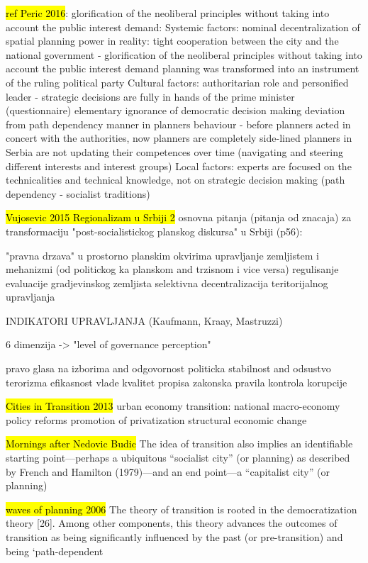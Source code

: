 \documentclass[11pt]{report}
\begin{document}
\hl{ref Peric 2016}:
glorification of the neoliberal principles without taking into account the public interest demand:
    Systemic factors:
nominal decentralization of spatial planning power
in reality: tight cooperation between the city and the national government - 
glorification of the neoliberal principles without taking into account the public interest demand
planning was transformed into an instrument of the ruling political party
    Cultural factors:
authoritarian role and personified leader - strategic decisions are fully in hands of the prime minister (questionnaire)
elementary ignorance of democratic decision making
deviation from path dependency manner in planners behaviour -  before planners acted in concert with the authorities, now planners are completely side-lined
planners in Serbia are not updating their competences over time (navigating and steering different interests and interest groups)
    Local factors:
experts are focused on the technicalities and technical knowledge, not on strategic decision making (path dependency - socialist traditions)

\hl{Vujosevic 2015 Regionalizam u Srbiji 2}
osnovna pitanja (pitanja od znacaja) za transformaciju "post-socialistickog planskog diskursa" u Srbiji (p56):

    "pravna drzava" u prostorno planskim okvirima
    upravljanje zemljistem i mehanizmi (od politickog ka planskom and trzisnom i vice versa)
    regulisanje evaluacije gradjevinskog zemljista
    selektivna decentralizacija teritorijalnog upravljanja

INDIKATORI UPRAVLJANJA (Kaufmann, Kraay, Mastruzzi)

6 dimenzija -> "level of governance perception"

    pravo glasa na izborima and odgovornost
    politicka stabilnost and odsustvo terorizma
    efikasnost vlade
    kvalitet propisa
    zakonska pravila
    kontrola korupcije
    
\hl{Cities in Transition 2013}
urban economy transition:
    national macro-economy policy reforms
    promotion of privatization
    structural economic change
    
\hl{Mornings after Nedovic Budic}
The idea of transition also implies an identiﬁable starting point—perhaps a ubiquitous “socialist city” (or planning) as described by French and Hamilton (1979)—and an end point—a “capitalist city” (or planning)

\hl{waves of planning 2006}
The  theory  of  transition  is  rooted  in  the democratization  theory  [26].  Among  other components,  this  theory  advances  the  outcomes  of  transition  as  being  significantly  influenced by the past (or pre-transition) and being ‘path-dependent
\end{document}
